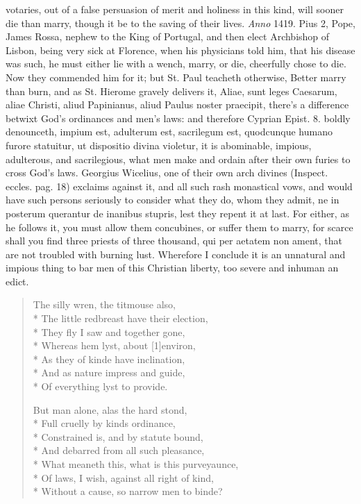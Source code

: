 votaries, out of a false persuasion of merit and holiness in this kind,
will sooner die than marry, though it be to the saving of their lives.
\emph{Anno} 1419. Pius 2, Pope, James Rossa, nephew to the King of
Portugal, and then elect Archbishop of Lisbon, being very sick at
Florence, when his physicians told him, that his disease was
such, he must either lie with a wench, marry, or die, cheerfully chose
to die. Now they commended him for it; but St. Paul teacheth otherwise,
Better marry than burn, and as St. Hierome gravely delivers it, Aliae,
sunt leges Caesarum, aliae Christi, aliud Papinianus, aliud Paulus
noster praecipit, there's a difference betwixt God's ordinances and
men's laws: and therefore Cyprian Epist. 8. boldly denounceth, impium
est, adulterum est, sacrilegum est, quodcunque humano furore statuitur,
ut dispositio divina violetur, it is abominable, impious, adulterous,
and sacrilegious, what men make and ordain after their own furies to
cross God's laws. Georgius Wicelius, one of their own arch
divines (Inspect. eccles. pag. 18) exclaims against it, and all such
rash monastical vows, and would have such persons seriously to consider
what they do, whom they admit, ne in posterum querantur de inanibus
stupris, lest they repent it at last. For either, as he follows it,
you must allow them concubines, or suffer them to marry, for
scarce shall you find three priests of three thousand, qui per aetatem
non ament, that are not troubled with burning lust. Wherefore I
conclude it is an unnatural and impious thing to bar men of this
Christian liberty, too severe and inhuman an edict.
%
{\gothfont
\begin{verse}
The silly wren, the titmouse also,\\*
The little redbreast have their election,\\*
They fly I saw and together gone,\\*
Whereas hem lyst, about [1\baselineskip]environ,\\*
As they of kinde have inclination,\\*
And as nature impress and guide,\\*
Of everything lyst to provide.

But man alone, alas the hard stond,\\*
Full cruelly by kinds ordinance,\\*
Constrained is, and by statute bound,\\*
And debarred from all such pleasance,\\*
What meaneth this, what is this purveyaunce,\\*
Of laws, I wish, against all right of kind,\\*
Without a cause, so narrow men to binde?
\end{verse}
}

